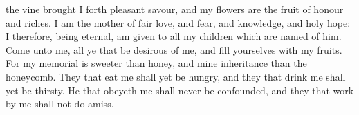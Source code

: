  the vine brought I forth pleasant savour, and my flowers are the fruit of honour and riches. I am the mother of fair love, and fear, and knowledge, and holy hope: I therefore, being eternal, am given to all my children which are named of him. Come unto me, all ye that be desirous of me, and fill yourselves with my fruits. For my memorial is sweeter than honey, and mine inheritance than the honeycomb. They that eat me shall yet be hungry, and they that drink me shall yet be thirsty. He that obeyeth me shall never be confounded, and they that work by me shall not do amiss.
